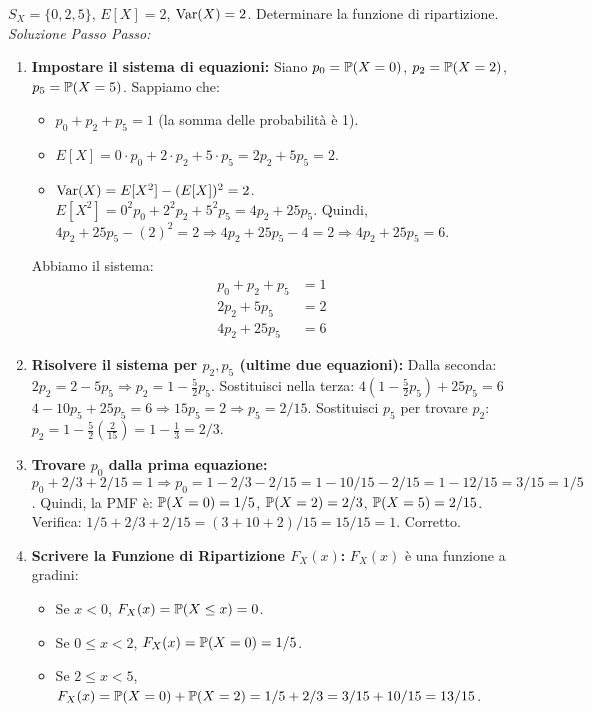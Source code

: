 \documentclass[12pt,a4paper]{article}
\begin{document}
\begin{example}
\begin{example}
$S_X = \{0, 2, 5\}$, $E[X]=2$, $\mathrm{Var}(X)=2$. Determinare la funzione di ripartizione.
\textit{Soluzione Passo Passo:}
\begin{enumerate}
    \item \textbf{Impostare il sistema di equazioni:}
    Siano $p_0 = \mathbb{P}(X=0)$, $p_2 = \mathbb{P}(X=2)$, $p_5 = \mathbb{P}(X=5)$.
    Sappiamo che:
    \begin{itemize}
        \item $p_0 + p_2 + p_5 = 1$ (la somma delle probabilità è 1).
        \item $E[X] = 0 \cdot p_0 + 2 \cdot p_2 + 5 \cdot p_5 = 2p_2 + 5p_5 = 2$.
        \item $\mathrm{Var}(X) = E[X^2] - (E[X])^2 = 2$.
          $E[X^2] = 0^2 p_0 + 2^2 p_2 + 5^2 p_5 = 4p_2 + 25p_5$.
          Quindi, $4p_2 + 25p_5 - (2)^2 = 2 \Rightarrow 4p_2 + 25p_5 - 4 = 2 \Rightarrow 4p_2 + 25p_5 = 6$.
    \end{itemize}
    Abbiamo il sistema:
    \begin{align*}
        p_0 + p_2 + p_5 &= 1 \\
        2p_2 + 5p_5 &= 2 \\
        4p_2 + 25p_5 &= 6
    \end{align*}
    \item \textbf{Risolvere il sistema per $p_2, p_5$ (ultime due equazioni):}
    Dalla seconda: $2p_2 = 2 - 5p_5 \Rightarrow p_2 = 1 - \frac{5}{2}p_5$.
    Sostituisci nella terza: $4(1 - \frac{5}{2}p_5) + 25p_5 = 6$
    $4 - 10p_5 + 25p_5 = 6 \Rightarrow 15p_5 = 2 \Rightarrow p_5 = 2/15$.
    Sostituisci $p_5$ per trovare $p_2$: $p_2 = 1 - \frac{5}{2}(\frac{2}{15}) = 1 - \frac{1}{3} = 2/3$.
    \item \textbf{Trovare $p_0$ dalla prima equazione:}
    $p_0 + 2/3 + 2/15 = 1 \Rightarrow p_0 = 1 - 2/3 - 2/15 = 1 - 10/15 - 2/15 = 1 - 12/15 = 3/15 = 1/5$.
    Quindi, la PMF è: $\mathbb{P}(X=0)=1/5$, $\mathbb{P}(X=2)=2/3$, $\mathbb{P}(X=5)=2/15$.
    Verifica: $1/5 + 2/3 + 2/15 = (3+10+2)/15 = 15/15=1$. Corretto.
    \item \textbf{Scrivere la Funzione di Ripartizione $F_X(x)$:}
    $F_X(x)$ è una funzione a gradini:
    \begin{itemize}
        \item Se $x < 0$, $F_X(x) = \mathbb{P}(X \le x) = 0$.
        \item Se $0 \le x < 2$, $F_X(x) = \mathbb{P}(X=0) = 1/5$.
        \item Se $2 \le x < 5$, $F_X(x) = \mathbb{P}(X=0) + \mathbb{P}(X=2) = 1/5 + 2/3 = 3/15 + 10/15 = 13/15$.

\end{itemize}
\end{enumerate}
\end{example}
\end{example}
\end{document}
